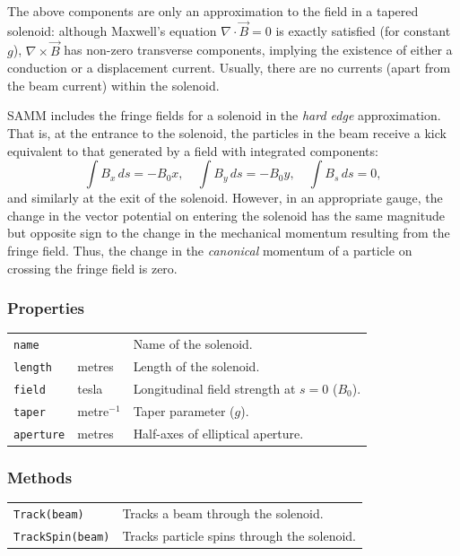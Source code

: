 \documentclass[11pt,twoside,a4paper]{article}
\begin{document}
The above components are only an approximation to the field in a tapered
solenoid: although Maxwell's equation $\nabla \cdot \vec{B} = 0$ is exactly
satisfied (for constant $g$), $\nabla \times \vec{B}$ has non-zero transverse
components, implying the existence of either a conduction or a displacement
current.  Usually, there are no currents (apart from the beam current) within
the solenoid.

SAMM includes the fringe fields for a solenoid in the \emph{hard edge}
approximation.  That is, at the entrance to the solenoid, the particles in the
beam receive a kick equivalent to that generated by a field with integrated
components:
\[
\int B_x\, ds = -B_0 x, \quad
\int B_y\, ds = -B_0 y, \quad
\int B_s\, ds = 0,
\]
and similarly at the exit of the solenoid.  However, in an appropriate gauge,
the change in the vector potential on entering the solenoid has the same
magnitude but opposite sign to the change in the mechanical momentum resulting
from the fringe field.  Thus, the change in the \emph{canonical} momentum of
a particle on crossing the fringe field is zero.

\subsubsection{Properties}

\begin{tabular}{|l|l|l|}
\hline
\texttt{name} &   & Name of the solenoid. \\
\texttt{length} & metres       & Length of the solenoid. \\
\texttt{field}  & tesla        & Longitudinal field strength at $s = 0$ ($B_0$). \\
\texttt{taper}  & metre$^{-1}$ & Taper parameter ($g$). \\
\texttt{aperture} & metres & Half-axes of elliptical aperture. \\
\hline
\end{tabular}
\vspace{0.2in}

\subsubsection{Methods}

\begin{tabular}{|l|l|}
\hline
\texttt{Track(beam)}     & Tracks a beam through the solenoid. \\
\texttt{TrackSpin(beam)} & Tracks particle spins through the solenoid. \\
\hline
\end{tabular}
\vspace{0.2in}
\end{document}
